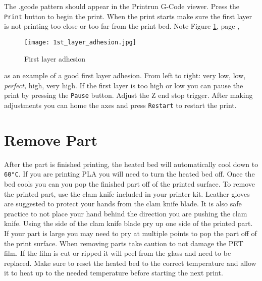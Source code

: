 The .gcode pattern should appear in the Printrun G-Code viewer. Press the \texttt{Print} button to begin the print. When the print starts make sure the first layer is not printing too close or too far from the print bed. Note 
Figure \ref{fig:1st_layer_adhesion}, page \pageref{fig:1st_layer_adhesion},
\begin{figure}[hbt]
\centering
\texttt{[image: 1st\_layer\_adhesion.jpg]}
\caption{First layer adhesion}
\label{fig:1st_layer_adhesion}
\end{figure}
as an example of a good first layer adhesion. From left to right: very low, low, \emph{perfect,} high, very high. If the first layer is too high or low you can pause the print by pressing the \texttt{Pause} button. Adjust the Z end stop trigger. After making adjustments you can home the axes and press \texttt{Restart} to restart the print.

\section{Remove Part}
After the part is finished printing, the heated bed will automatically cool down to \texttt{60°C}. If you are printing PLA you will need to turn the heated bed off. Once the bed cools you can you pop the finished part off of the printed surface. To remove the printed part, use the clam knife included in your printer kit. Leather gloves are suggested to protect your hands from the clam knife blade. It is also safe practice to not place your hand behind the direction you are pushing the clam knife. Using the side of the clam knife blade pry up one side of the printed part. If your part is large you may need to pry at multiple points to pop the part off of the print surface. When removing parts take caution to not damage the PET film. If the film is cut or ripped it will peel from the glass and need to be replaced. Make sure to reset the heated bed to the correct temperature and allow it to heat up to the needed temperature before starting the next print.

